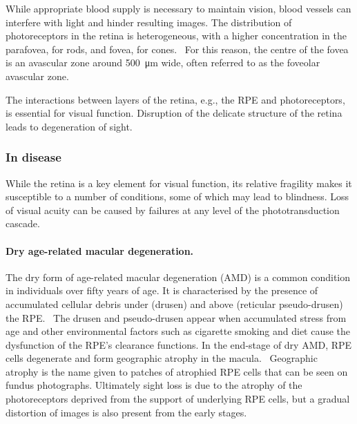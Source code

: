 \documentclass[12pt,a4paper]{journal}
\begin{document}
While appropriate blood supply is necessary to maintain vision, blood vessels can interfere with light and hinder resulting images.
The distribution of photoreceptors in the retina is heterogeneous, with a higher concentration in the parafovea, for rods, and fovea, for cones.~\cite{Zouache_2022}
For this reason, the centre of the fovea is an avascular zone around \SI{500}{\micro\meter} wide, often referred to as the foveolar avascular zone.

The interactions between layers of the retina, e.g., the RPE and photoreceptors, is essential for visual function.
Disruption of the delicate structure of the retina leads to degeneration of sight.

\subsubsection*{In disease}

While the retina is a key element for visual function, its relative fragility makes it susceptible to a number of conditions, some of which may lead to blindness.
Loss of visual acuity can be caused by failures at any level of the phototransduction cascade.\\

\paragraph*{Dry age-related macular degeneration.}
The dry form of age-related macular degeneration (AMD) is a common condition in individuals over fifty years of age.
It is characterised by the presence of accumulated cellular debris under (drusen) and above (reticular pseudo-drusen) the RPE.~\cite{Bottos_2012}
The drusen and pseudo-drusen appear when accumulated stress from age and other environmental factors such as cigarette smoking and diet cause the dysfunction of the RPE's clearance functions.
In the end-stage of dry AMD, RPE cells degenerate and form geographic atrophy in the macula.~\cite{Jager_2008}
Geographic atrophy is the name given to patches of atrophied RPE cells that can be seen on fundus photographs.
Ultimately sight loss is due to the atrophy of the photoreceptors deprived from the support of underlying RPE cells, but a gradual distortion of images is also present from the early stages.~\cite{Newsom_2008,Zacks_2022}\\
\end{document}
